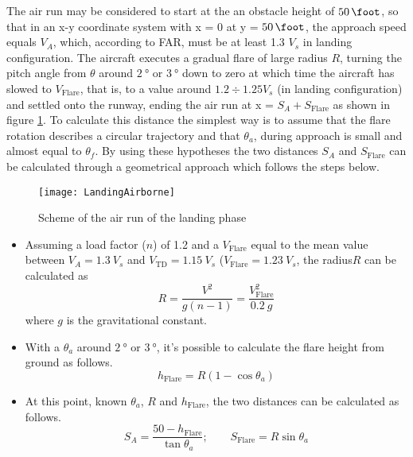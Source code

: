 \bigskip
\noindent
The air run may be considered to start at the an obstacle height of $\SI{50}{\foot}$, so that in an x-y coordinate system with x = 0 at y = $\SI{50}{\foot}$, the approach speed equals $V_A$, which, according to \gls{FAR}, must be at least 1.3 $V_s$ in landing configuration. The aircraft executes a gradual flare of large radius $R$, turning the pitch angle from $\theta$ around $\SI{2}{\degree}$ or $\SI{3}{\degree}$ down to zero at which time the aircraft has slowed to $V_{\text{Flare}}$, that is, to a value around $1.2\div1.25 V_s$ (in landing configuration) and settled onto the runway, ending the air run at x = $S_A+S_{\text{Flare}}$ as shown in figure \ref{fig:LANDairborne}. To calculate this distance the simplest way is to assume that the flare rotation describes a circular trajectory and that $\theta_a$, during approach is small and almost equal to $\theta_f$. By using these hypotheses the two distances $S_A$ and $S_{\text{Flare}}$ can be calculated through a geometrical approach which follows the steps below. 
%
\begin{figure}[!b]
\centering
\texttt{[image: LandingAirborne]}
\caption{Scheme of the air run of the landing phase}
\label{fig:LANDairborne}
\end{figure}
%
\begin{itemize}
%
\item Assuming a load factor ($n$) of 1.2 and a $V_{\text{Flare}}$ equal to the mean value between $V_A=1.3\ V_s$ and $V_{\text{TD}}=1.15\ V_s$ ($V_{\text{Flare}}=1.23\ V_s$, the radius$R$ can be calculated as 
\begin{equation}
R=\dfrac{V^2}{g\left(n-1\right)}=\dfrac{V_{\text{Flare}}^2}{0.2\ g}
\label{eqn:Landing:Airborne:A}
\end{equation}
\noindent
where $g$ is the gravitational constant. 
%
\item With a $\theta_a$ around  $\SI{2}{\degree}$ or $\SI{3}{\degree}$, it's possible to calculate the flare height from ground as follows.
\begin{equation}
h_{\text{Flare}}=R\left(1-\cos\theta_a\right)
\label{eqn:Landing:Airborne:B}
\end{equation}
%
\item At this point, known $\theta_a$, $R$ and $h_{\text{Flare}}$, the two distances can be calculated as follows.
\begin{equation}
S_A=\dfrac{50-h_{\text{Flare}}}{\tan\theta_a}; \quad\quad S_{\text{Flare}}=R\sin\theta_a
\label{eqn:Landing:Airborne:C}
\end{equation}
%
\end{itemize}
%

